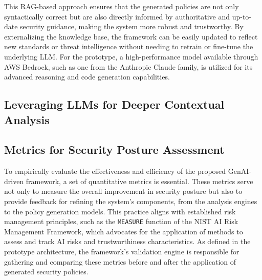 This RAG-based approach ensures that the generated policies are not only syntactically correct but are also directly informed by authoritative and up-to-date security guidance, making the system more robust and trustworthy. By externalizing the knowledge base, the framework can be easily updated to reflect new standards or threat intelligence without needing to retrain or fine-tune the underlying LLM. For the prototype, a high-performance model available through AWS Bedrock, such as one from the Anthropic Claude family, is utilized for its advanced reasoning and code generation capabilities.

\subsection{Leveraging LLMs for Deeper Contextual Analysis} %
\label{sec:Leveraging LLMs for Deeper Contextual Analysis}



\subsection{Metrics for Security Posture Assessment} %
\label{sec:Metrics for Security Posture Assessment}

To empirically evaluate the effectiveness and efficiency of the proposed GenAI-driven framework, a set of quantitative metrics is essential. These metrics serve not only to measure the overall improvement in security posture but also to provide feedback for refining the system's components, from the analysis engines to the policy generation models. This practice aligns with established risk management principles, such as the \texttt{MEASURE} function of the NIST AI Risk Management Framework, which advocates for the application of methods to assess and track AI risks and trustworthiness characteristics. As defined in the prototype architecture, the framework's validation engine is responsible for gathering and comparing these metrics before and after the application of generated security policies.

